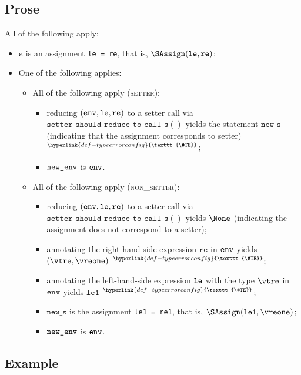 \documentclass{book}
\newcommand\TypeErrorConfig[0]{\hyperlink{def-typeerrorconfig}{\texttt{\#TE}}}
\newcommand\ProseOrTypeError[0]{\hyperlink{def-proseortypeerror}{$^{\TypeErrorConfig}$}}
\newcommand\inlinesetter[1]{\texttt{setter\_should\_reduce\_to\_call\_s}(#1)}
\newcommand\vleone[0]{\texttt{le1}}
\newcommand\vre[0]{\texttt{re}}
\newcommand\vs[0]{\texttt{s}}
\newcommand\news[0]{\texttt{new\_s}}
\begin{document}
\subsection{Prose}
All of the following apply:
\begin{itemize}
  \item $\vs$ is an assignment \texttt{le = re}, that is, $\SAssign(\vle, \vre)$;
  \item One of the following applies:
  \begin{itemize}
    \item All of the following apply (\textsc{setter}):
    \begin{itemize}
      \item reducing $(\tenv, \vle, \vre)$ to a setter call via \\ $\inlinesetter{}$ yields the statement $\news$
      (indicating that the assignment corresponds to setter) \ProseOrTypeError;
      \item $\texttt{new\_env}$ is $\texttt{env}$.
    \end{itemize}

    \item All of the following apply (\textsc{non\_setter}):
    \begin{itemize}
      \item reducing $(\tenv, \vle, \vre)$ to a setter call via \\ $\inlinesetter{}$ yields $\None$
            (indicating the assignment does not correspond to a setter);
      \item annotating the right-hand-side expression $\vre$ in $\texttt{env}$ yields $(\vtre, \vreone)$ \ProseOrTypeError;
      \item annotating the left-hand-side expression $\texttt{le}$ with the type $\vtre$ in $\texttt{env}$ yields $\vleone$ \ProseOrTypeError;
      \item $\news$ is the assignment \texttt{le1 = re1}, that is, $\SAssign(\vleone, \vreone)$;
      \item $\texttt{new\_env}$ is $\texttt{env}$.
    \end{itemize}

  \end{itemize}
\end{itemize}

\subsection{Example}

\end{document}

